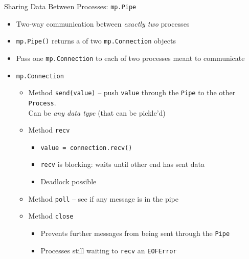 
\begin{frame}{Sharing Data Between Processes: \texttt{mp.Pipe}}
%
\begin{itemize}
\item Two-way communication between \emph{exactly two} processes
\item \texttt{mp.Pipe()} returns a  of two \texttt{mp.Connection} objects
\item Pass one \texttt{mp.Connection} to each of two processes meant to communicate
\item \texttt{mp.Connection} 
	\begin{itemize}
	\item Method \texttt{send(value)} -- push \texttt{value} through the \texttt{Pipe} to the other \texttt{Process}.\\
		Can be \emph{any data type} (that can be pickle'd)
	\item Method \texttt{recv}
		\begin{itemize}
		\item \texttt{value = connection.recv()}
		\item \texttt{recv} is blocking: waits until other end has sent data
		\item Deadlock possible
		\end{itemize}
	\item Method \texttt{poll}  -- see if any message is in the pipe
	\item Method \texttt{close}
		\begin{itemize}
		\item Prevents further messages from being sent through the \texttt{Pipe}
		\item Processes still waiting to \texttt{recv}  an \texttt{EOFError}
		\end{itemize}
	\end{itemize}
\end{itemize}
%
\end{frame}


